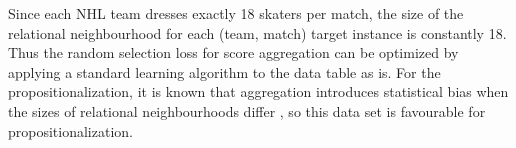 \documentclass[conference]{IEEEtran}
\newcommand{\team}{T}
\newcommand{\player}{P}
\newcommand{\match}{M}
\begin{document}
%

Since each NHL team dresses exactly 18 skaters per match, the size of the relational neighbourhood for each (team, match) target instance is constantly 18. Thus the random selection loss for score aggregation can be optimized by applying a standard learning algorithm to the data table as is. For the propositionalization, it is known that aggregation introduces statistical bias when the sizes of relational neighbourhoods differ \cite{DavidJensen2002}, so this data set is favourable for propositionalization.
\end{document}
